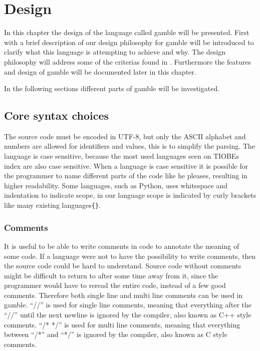 \chapter{Design}
\label{cha:Design}
In this chapter the design of the language called \gls{gamble} will be presented.
First with a brief description of our design philosophy for \gls{gamble} will be introduced to clarify what this language is attempting to achieve and why.
The design philosophy will address some of the criterias found in .
Furthermore the features and design of \gls{gamble} will be documented later in this chapter.



In the following sections different parts of \gls{gamble} will be investigated.

\section{Core syntax choices}
The source code must be encoded in UTF-8, but only the ASCII alphabet and numbers are allowed for identifiers and values, this is to simplify the parsing. 
The language is case sensitive, because the most used languages seen on TIOBEs index\citep{TIOBE} are also case sensitive.
When a language is case sensitive it is possible for the programmer to name different parts of the code like he pleases, resulting in higher readability.
Some languages, such as Python, uses whitespace and indentation to indicate scope, in our language scope is indicated by curly brackets like many existing languages\texttt{\{\}}.  

\subsection*{Comments}
It is useful to be able to write comments in code to annotate the meaning of some code.
If a language were not to have the possibility to write comments, then the source code could be hard to understand.
Source code without comments might be difficult to return to after some time away from it, since the programmer would have to reread the entire code, instead of a few good comments.\citep{Commenting}
Therefore both single line and multi line comments can be used in \gls{gamble}. 
``//'' is used for single line comments, meaning that everything after the ``//'' until the next newline is ignored by the compiler, also known as C++ style comments. 
``/* */'' is used for multi line comments, meaning that everything between ``/*'' and ``*/'' is ignored by the compiler, also known as C style comments. 


